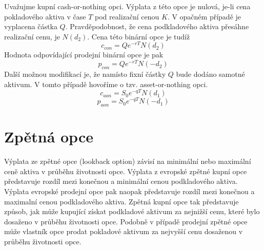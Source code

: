 \documentclass[a4paper]{book}
\begin{document}
Uvažujme kupní cash-or-nothing opci. Výplata z této opce je nulová, je-li cena pokladového aktiva v čase $T$ pod realizační cenou $K$. V opačném případě je vyplacena částka $Q$. Pravděpodobnost, že cena podkladového aktiva přesáhne realizační cenu, je $N(d_2)$. Cena této binární opce je tudíž
\begin{equation*}
c_{con} = Qe^{-rT}N(d_2)
\end{equation*}
Hodnota odpovídající prodejní binární opce je pak 
\begin{equation*}
p_{con} = Qe^{-rT}N(-d_2)
\end{equation*}
Další možnou modifikací je, že namísto fixní částky $Q$ bude dodáno samotné aktivum. V tomto případě hovoříme o tzv. asset-or-nothing opci.
\begin{equation*}
c_{aon} = S_0e^{-qT}N(d_1)
\end{equation*}
\begin{equation*}
p_{aon} = S_0e^{-qT}N(-d_1)
\end{equation*}

\section{Zpětná opce}

Výplata ze zpětné opce (lookback option) závisí na minimální nebo maximální ceně aktiva v průběhu životnosti opce. Výplata z evropské zpětné kupní opce představuje rozdíl mezi konečnou a minimální cenou podkladového aktiva. Výplata evropské prodejní opce pak naopak představuje rozdíl mezi konečnou a maximalní cenou podkladového aktiva. Zpětná kupní opce tak představuje způsob, jak může kupující získat podkladové aktivum za nejnižší cenu, které bylo dosaženo v průběhu životnosti opce. Podobně v případě prodejní zpětné opce může vlastník opce prodat pokladové aktivum za nejvyšší cenu dosaženou v průběhu životnosti opce.
\end{document}
